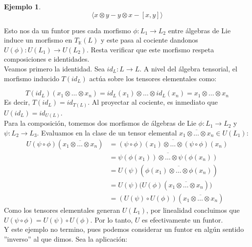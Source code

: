 \documentclass{article}
\newcommand{\prodint}[1]{\langle #1\rangle}
\newcommand{\cuerpo}{\mathbb{K}}
\theoremstyle{plain}
\theoremstyle{definition}
\newtheorem{ejemplo}[theorem]{Ejemplo}
\theoremstyle{remark}
\begin{document}
\begin{ejemplo}
    \begin{equation*}
        \prodint{x \otimes y  - y \otimes x - [x,y]}
    \end{equation*}

    Esto nos da un funtor pues cada morfismo $\phi:L_1 \to L_2$ entre álgebras de Lie induce un morfismo en $T_\cuerpo(L)$ y este pasa al cociente dandonos $U(\phi): U(L_1) \to U(L_2)$. Resta verificar que este morfismo respeta composiciones e identidades. \\

    Veamos primero la identidad. Sea $id_L: L \to L$. A nivel del álgebra tensorial, el morfismo inducido $T(id_L)$ actúa sobre los tensores elementales como:

        \begin{equation*}
            T(id_L)(x_1 \otimes \dots \otimes x_n) = id_L(x_1) \otimes \dots \otimes id_L(x_n) = x_1 \otimes \dots \otimes x_n
        \end{equation*}
        Es decir, $T(id_L) = id_{T(L)}$. Al proyectar al cociente, es inmediato que $U(id_L) = id_{U(L)}$. \\

        Para la composición, tomemos dos morfismos de álgebras de Lie $\phi: L_1 \to L_2$ y $\psi: L_2 \to L_3$. Evaluamos en la clase de un tensor elemental $\overline{x_1 \otimes \dots \otimes x_n} \in U(L_1)$:
        \begin{align*}
            U(\psi \circ \phi)\left(\overline{x_1 \otimes \dots \otimes x_n}\right) &= \overline{(\psi \circ \phi)(x_1) \otimes \dots \otimes (\psi \circ \phi)(x_n)} \\
            &= \overline{\psi(\phi(x_1)) \otimes \dots \otimes \psi(\phi(x_n))} \\
            &= U(\psi)\left( \overline{\phi(x_1) \otimes \dots \otimes \phi(x_n)} \right) \\
            &= U(\psi) \Big( U(\phi)\left(\overline{x_1 \otimes \dots \otimes x_n}\right) \Big) \\
            &= (U(\psi) \circ U(\phi))\left(\overline{x_1 \otimes \dots \otimes x_n}\right)
        \end{align*}
        Como los tensores elementales generan $U(L_1)$, por linealidad concluimos que $U(\psi \circ \phi) = U(\psi) \circ U(\phi)$. Por lo tanto, $U$ es efectivamente un funtor. \\

        Y este ejemplo no termino, pues podemos considerar un funtor en algún sentido ''inverso'' al que dimos. Sea la aplicación:
        

\end{ejemplo}
\end{document}
